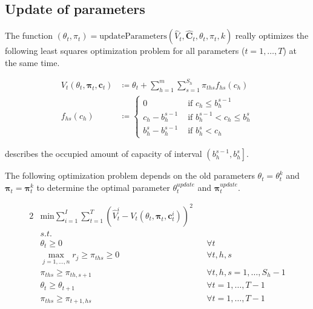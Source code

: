 \subsection{Update of parameters}
The function $\left(\theta_t, \pi_t \right) = \text{updateParameters}\left(\hat{V}_t, \mathbf{\hat{C}}_t, \theta_t, \pi_t, k\right)$ really optimizes the following least squares optimization problem for all parameters ($t = 1, \dots, T$) at the same time.

\begin{align}
V_t(\theta_t, \mathbf{\pi}_t, \mathbf{c}_t) & \coloneqq \theta_t + \sum_{h=1}^{m}\sum_{s=1}^{S_h} \pi_{ths} f_{hs}(c_h) \\
f_{hs}(c_h) &\coloneqq 
\begin{cases}\label{def-f}
0 & \text{ if } c_h \leq b_h^{s-1}\\
c_h - b_h^{s-1} & \text{ if } b_h^{s-1} < c_h \leq b_h^s \\
b_h^s - b_h^{s-1} & \text{ if } b_h^s < c_h
\end{cases}
\end{align}

 describes the occupied amount of capacity of interval $\left(b_h^{s-1}, b_h^s\right]$.

The following optimization problem depends on the old parameters $\theta_t = \theta_t^k$ and $\mathbf{\pi}_t = \mathbf{\pi}_t^k$ to determine the optimal parameter $\theta_t^{update}$ and $\mathbf{\pi}_t^{update}$.

\begin{alignat}{2}
& \text{min} \sum_{i=1}^{I}\sum_{t=1}^{T} \left( \hat{V}_t^i - V_t(\theta_t, \mathbf{\pi}_t, \mathbf{c}_t^i) \right)^2 && \\
& s.t. && \\
& \theta_t \geq 0 && \forall t\\
& \max_{j=1, \dots, n} r_j \geq \pi_{ths} \geq 0 && \forall t, h, s\\
& \pi_{ths} \geq \pi_{th,s+1} && \forall t, h, s = 1, \dots, S_h-1\\
& \theta_t \geq \theta_{t+1} && \forall t = 1, \dots, T-1\\
& \pi_{ths} \geq \pi_{t+1,hs} && \forall t = 1, \dots, T-1
\end{alignat}

